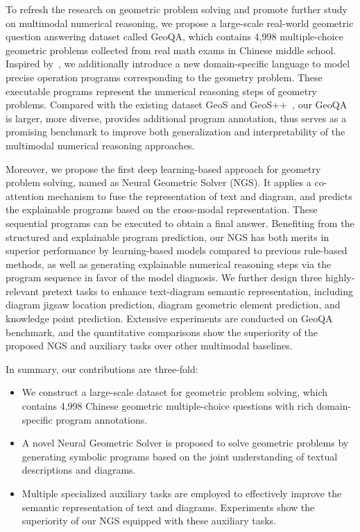 \documentclass[11pt,a4paper]{article}
\begin{document}
To refresh the research on geometric problem solving and promote further study on multimodal numerical reasoning, we propose a large-scale real-world geometric question answering dataset called GeoQA, which contains 4,998 multiple-choice geometric problems collected from real math exams in Chinese middle school. Inspired by~\citet{amini2019mathqa}, we additionally introduce a new domain-specific language to model precise operation programs corresponding to the geometry problem. These executable programs represent the numerical reasoning steps of geometry problems. 
Compared with the existing dataset GeoS and GeoS++~\cite{seo2015solving,sachan2017textbooks}, 
our GeoQA is larger, more diverse, provides additional program annotation, thus serves as a promising benchmark to improve both generalization and interpretability of the multimodal numerical reasoning approaches.



Moreover, we propose the first deep learning-based approach for geometry problem solving, named as Neural Geometric Solver (NGS). It applies a co-attention mechanism to fuse the representation of text and diagram, and predicts the explainable programs based on the cross-modal representation. These sequential programs can be executed to obtain a final answer.  Benefiting from the structured and explainable program prediction, our NGS has both merits in superior performance by learning-based models compared to previous rule-based methods, as well as generating explainable numerical reasoning steps via the program sequence in favor of the model diagnosis. We further design three highly-relevant pretext tasks to enhance text-diagram semantic representation, including diagram jigsaw location prediction, diagram geometric element prediction, and knowledge point prediction. Extensive experiments are conducted on GeoQA benchmark, and the quantitative comparisons show the superiority of the proposed NGS and auxiliary tasks over other multimodal baselines.












In summary, our contributions are three-fold:
\begin{itemize}[leftmargin=*]
\setlength{\itemsep}{0pt}
\setlength{\parsep}{0pt}
\setlength{\parskip}{0pt}
\item We construct a large-scale dataset for geometric problem solving, which contains 4,998 Chinese geometric multiple-choice questions with rich domain-specific program annotations. 
\item A novel Neural Geometric Solver is proposed to solve geometric problems by generating symbolic programs based on the joint understanding of textual descriptions and diagrams. 
\item Multiple specialized auxiliary tasks are employed to effectively improve the semantic representation of text and diagrams. Experiments show the superiority of our NGS equipped with these auxiliary tasks.
\end{itemize}
\end{document}
